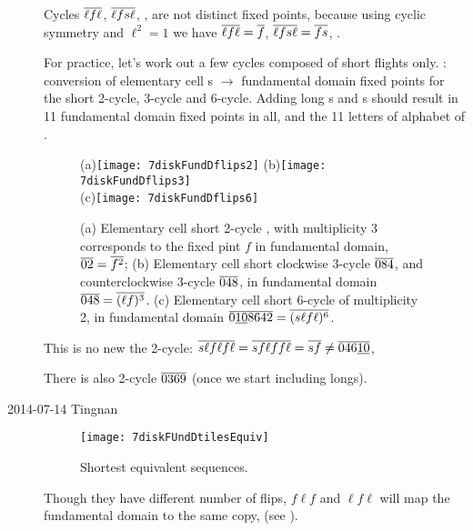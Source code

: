 \begin{description}
Cycles ${\overline{\ell f\ell}}$,
${\overline{\ell fs\ell}}$,
\etc, are not distinct fixed points, because using cyclic symmetry and
$\ell^2 =1$ we have
 ${\overline{\ell f\ell}}={\overline{f}}$,
${\overline{\ell fs\ell}}={\overline{fs}}$, \etc.


For practice, let's work out a
few  cycles composed of short flights only.
: conversion of elementary cell \po s $\to$
fundamental domain fixed points for the short 2-cycle, 3-cycle and
6-cycle.
Adding long \po s and \rpo s should result in 11 fundamental domain fixed
points in all, and the 11 letters of alphabet of .

\begin{figure}
\begin{center}
(a)\texttt{[image: 7diskFundDflips2]}
(b)\texttt{[image: 7diskFundDflips3]}
\\
(c)\texttt{[image: 7diskFundDflips6]}
\end{center}
\caption{
(a) Elementary cell short 2-cycle , with multiplicity 3 corresponds to
the fixed pint $f$ in fundamental domain, ${\overline{02}}={\overline{f^2}}$;
(b) Elementary cell short clockwise 3-cycle ${\overline{084}}$, and
counterclockwise 3-cycle ${\overline{048}}$, in
fundamental domain ${\overline{048}}={\overline{(\ell f)^3}}$.
(c) Elementary cell short 6-cycle of multiplicity 2, in
fundamental domain ${\overline{0\underline{10}8642}}={\overline{(s\ell f\ell )^6}}$.
    }
\label{7diskFundDflips2}
\end{figure}

This is no new the 2-cycle:
$ {\overline{s \ell f \ell f \ell}}
= {\overline{s f \ell f f \ell}}
= {\overline{s f}}
\neq {\ensuremath{\overline{046\underline{10}}}}$,

There is also 2-cycle ${\overline{0369}}$ (once we start including longs).

\item[2014-07-14 Tingnan]
\begin{figure}
\texttt{[image: 7diskFUndDtilesEquiv]}
\caption{Shortest equivalent sequences.}
\label{fig:symbolEquiv}
\end{figure}
Though they have different number of flips, $f\ell f$ and $\ell f \ell$
will map the fundamental domain to the same copy, (see
).


\end{description}
